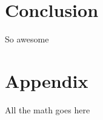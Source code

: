 \documentclass[12pt, oneside]{article}
\begin{document}
\section{Conclusion}
So awesome

\section{Appendix}
All the math goes here
\end{document}
